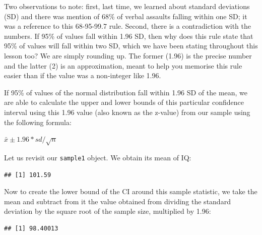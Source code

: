 \documentclass[
]{book}
\newenvironment{Shaded}{\begin{snugshade}}{\end{snugshade}}
\newcommand{\AttributeTok}[1]{\textcolor[rgb]{0.77,0.63,0.00}{#1}}
\newcommand{\ConstantTok}[1]{\textcolor[rgb]{0.00,0.00,0.00}{#1}}
\newcommand{\DecValTok}[1]{\textcolor[rgb]{0.00,0.00,0.81}{#1}}
\newcommand{\FloatTok}[1]{\textcolor[rgb]{0.00,0.00,0.81}{#1}}
\newcommand{\FunctionTok}[1]{\textcolor[rgb]{0.00,0.00,0.00}{#1}}
\newcommand{\NormalTok}[1]{#1}
\newcommand{\SpecialCharTok}[1]{\textcolor[rgb]{0.00,0.00,0.00}{#1}}
\begin{document}
Two observations to note: first, last time, we learned about standard deviations (SD) and there was mention of 68\% of verbal assaults falling within one SD; it was a reference to this 68-95-99.7 rule. Second, there is a contradiction with the numbers. If 95\% of values fall within 1.96 SD, then why does this rule state that 95\% of values will fall within two SD, which we have been stating throughout this lesson too? We are simply rounding up. The former (1.96) is the precise number and the latter (2) is an approximation, meant to help you memorise this rule easier than if the value was a non-integer like 1.96.

If 95\% of values of the normal distribution fall within 1.96 SD of the mean, we are able to calculate the upper and lower bounds of this particular confidence interval using this 1.96 value (also known as the z-value) from our sample using the following formula:

\(\bar{x} \pm 1.96*{sd}/{\sqrt{n}}\)

Let us revisit our \texttt{sample1} object. We obtain its mean of IQ:

\begin{Shaded}
\end{Shaded}

\begin{verbatim}
## [1] 101.59
\end{verbatim}

Now to create the lower bound of the CI around this sample statistic, we take the mean and subtract from it the value obtained from dividing the standard deviation by the square root of the sample size, multiplied by 1.96:

\begin{Shaded}
\end{Shaded}

\begin{verbatim}
## [1] 98.40013
\end{verbatim}
\end{document}
